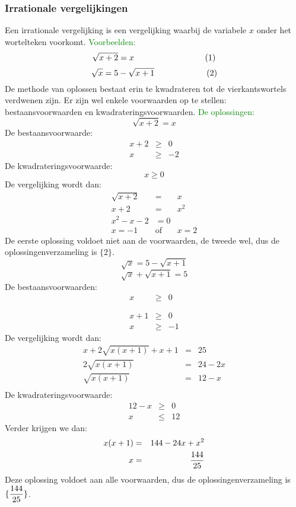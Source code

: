 \subsubsection{Irrationale vergelijkingen} \label{irrationale_vergelijkingen}
\hypertarget{irrationale_vergelijkingen}{}
		Een irrationale vergelijking is een vergelijking waarbij de variabele $x$ onder het 		wortelteken voorkomt.\newline
		\textcolor{green} {Voorbeelden:}
		\[\sqrt{x+2}=x \hskip 3cm (1)\]
		\vskip 0.5cm
		\[\sqrt{x}=5-\sqrt{x+1}\hskip 2.2cm (2)\]
		De methode van oplossen bestaat erin te kwadrateren tot de vierkantswortels 		verdwenen zijn.\newline
		Er zijn wel enkele voorwaarden op te stellen: bestaansvoorwaarden en 		kwadrateringsvoorwaarden.\newline
		\textcolor{green}{De oplossingen:}\newline
		\[\sqrt{x+2}=x\]
		De bestaansvoorwaarde: \begin{eqnarray}
						x+2 & \geq &  0\\
						x & \geq & -2
						\end{eqnarray}
		De kwadrateringsvoorwaarde: \[x \geq 0\]
		De vergelijking wordt dan: \begin{eqnarray}
						   \sqrt{x+2}&=&x	\\
						   x+2 & = & x^2\\
						   x^2-x-2 & = 0\\
						   x=-1 & \mbox{of} & x=2		
						   \end{eqnarray}	
		De eerste oplossing voldoet niet aan de voorwaarden, de tweede wel, \newline 
		dus de oplossingenverzameling is $\{2\}$.\vskip 1cm
		\[\sqrt{x}=5-\sqrt{x+1}\]
		\[\sqrt{x}+\sqrt{x+1}=5\]
		De bestaansvoorwaarden: \begin{eqnarray}
						x & \geq &  0\\
						  &      &   \\
						  &      &   \\ 					
						x+1 & \geq &  0\\
						x & \geq & -1
						\end{eqnarray}
		De vergelijking wordt dan: \begin{eqnarray}
						   x+2\sqrt{x(x+1)}+x+1 & = & 25\\
						   2\sqrt{x(x+1)} & = & 24-2x\\
						   \sqrt{x(x+1)} & = & 12-x\\			
						   \end{eqnarray}	
		De kwadrateringsvoorwaarde: \begin{eqnarray}
						    12-x & \geq &  0\\
						    x & \leq & 12
						    \end{eqnarray}
		Verder krijgen we dan: \begin{eqnarray}
						x(x+1) & = & 144-24x+x^2\\
						x & = & \displaystyle\frac{\displaystyle 144}{\displaystyle 25}
						\end{eqnarray}
		Deze oplossing voldoet aan alle voorwaarden, dus de oplossingenverzameling is 		$\{\displaystyle\frac{\displaystyle 144}{\displaystyle 25}\}$.


